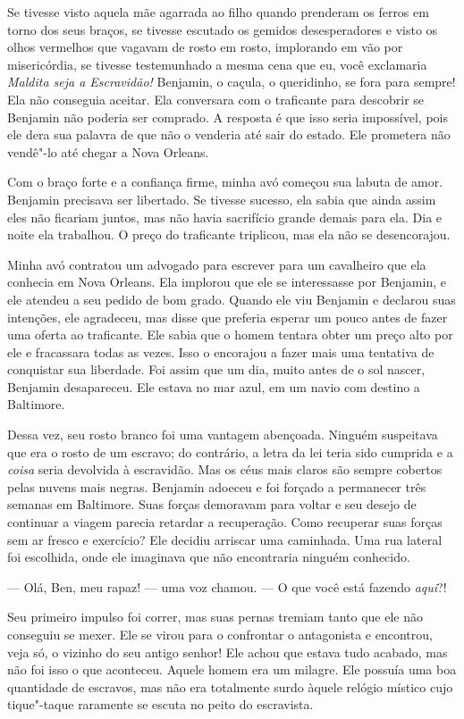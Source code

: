 Se tivesse visto aquela mãe agarrada ao
filho quando prenderam os ferros em torno dos seus braços, se tivesse
escutado os gemidos desesperadores e visto os olhos vermelhos que
vagavam de rosto em rosto, implorando em vão por misericórdia, se
tivesse testemunhado a mesma cena que eu, você exclamaria \emph{Maldita
seja a Escravidão!} Benjamin, o caçula, o queridinho, se fora para
sempre! Ela não conseguia aceitar. Ela conversara com o traficante para
descobrir se Benjamin não poderia ser comprado. A resposta é que isso
seria impossível, pois ele dera sua palavra de que não o venderia até
sair do estado. Ele prometera não vendê"-lo até chegar a Nova Orleans.

Com o braço forte e a confiança firme,
minha avó começou sua labuta de amor. Benjamin precisava ser libertado.
Se tivesse sucesso, ela sabia que ainda assim eles não ficariam juntos,
mas não havia sacrifício grande demais para ela. Dia e noite ela
trabalhou. O preço do traficante triplicou, mas ela não se desencorajou.

Minha avó contratou um advogado para
escrever para um cavalheiro que ela conhecia em Nova Orleans. Ela
implorou que ele se interessasse por Benjamin, e ele atendeu a seu
pedido de bom grado. Quando ele viu Benjamin e declarou suas intenções,
ele agradeceu, mas disse que preferia esperar um pouco antes de fazer
uma oferta ao traficante. Ele sabia que o homem tentara obter um preço
alto por ele e fracassara todas as vezes. Isso o encorajou a fazer mais
uma tentativa de conquistar sua liberdade. Foi assim que um dia, muito
antes de o sol nascer, Benjamin desapareceu. Ele estava no mar azul, em
um navio com destino a Baltimore.

Dessa vez, seu rosto branco foi uma
vantagem abençoada. Ninguém suspeitava que era o rosto de um escravo; do
contrário, a letra da lei teria sido cumprida e a \emph{coisa} seria
devolvida à escravidão. Mas os céus mais claros são sempre cobertos
pelas nuvens mais negras. Benjamin adoeceu e foi forçado a permanecer
três semanas em Baltimore. Suas forças demoravam para voltar e seu
desejo de continuar a viagem parecia retardar a recuperação. Como
recuperar suas forças sem ar fresco e exercício? Ele decidiu arriscar
uma caminhada. Uma rua lateral foi escolhida, onde ele imaginava que não
encontraria ninguém conhecido.

--- Olá, Ben, meu rapaz! --- uma voz chamou. --- O que você está fazendo
\emph{aqui}?!

Seu primeiro impulso foi correr, mas
suas pernas tremiam tanto que ele não conseguiu se mexer. Ele se virou
para o confrontar o antagonista e encontrou, veja só, o vizinho do seu
antigo senhor! Ele achou que estava tudo acabado, mas não foi isso o que
aconteceu. Aquele homem era um milagre. Ele possuía uma boa quantidade
de escravos, mas não era totalmente surdo àquele relógio místico cujo
tique"-taque raramente se escuta no peito do escravista.

